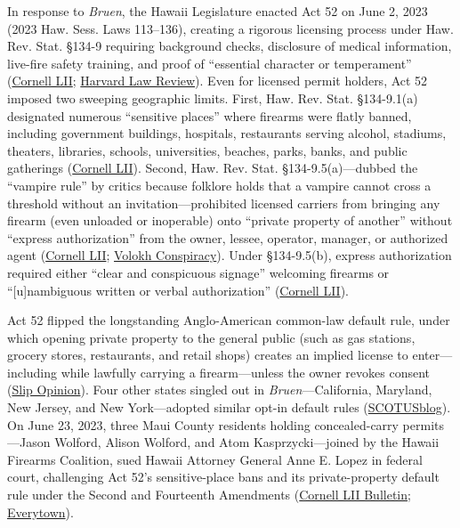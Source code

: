 \documentclass[12pt]{article}
\begin{document}
In response to \textit{Bruen}, the Hawaii Legislature enacted Act 52 on June 2, 2023 (2023 Haw. Sess. Laws 113--136), creating a rigorous licensing process under Haw. Rev. Stat. \S{}134-9 requiring background checks, disclosure of medical information, live-fire safety training, and proof of ``essential character or temperament'' (\href{https://www.law.cornell.edu/supremecourt/text/24-1046}{Cornell LII}; \href{https://harvardlawreview.org/print/vol-140/wolford-v-lopez/}{Harvard Law Review}). Even for licensed permit holders, Act 52 imposed two sweeping geographic limits. First, Haw. Rev. Stat. \S{}134-9.1(a) designated numerous ``sensitive places'' where firearms were flatly banned, including government buildings, hospitals, restaurants serving alcohol, stadiums, theaters, libraries, schools, universities, beaches, parks, banks, and public gatherings (\href{https://www.law.cornell.edu/supremecourt/text/24-1046}{Cornell LII}). Second, Haw. Rev. Stat. \S{}134-9.5(a)---dubbed the ``vampire rule'' by critics because folklore holds that a vampire cannot cross a threshold without an invitation---prohibited licensed carriers from bringing any firearm (even unloaded or inoperable) onto ``private property of another'' without ``express authorization'' from the owner, lessee, operator, manager, or authorized agent (\href{https://www.law.cornell.edu/supremecourt/text/24-1046}{Cornell LII}; \href{https://reason.com/volokh/2026/10/28/how-wolford-v-lopez-refines-second-amendment-doctrine/}{Volokh Conspiracy}). Under \S{}134-9.5(b), express authorization required either ``clear and conspicuous signage'' welcoming firearms or ``[u]nambiguous written or verbal authorization'' (\href{https://www.law.cornell.edu/supremecourt/text/24-1046}{Cornell LII}).

Act 52 flipped the longstanding Anglo-American common-law default rule, under which opening private property to the general public (such as gas stations, grocery stores, restaurants, and retail shops) creates an implied license to enter---including while lawfully carrying a firearm---unless the owner revokes consent (\href{https://www.supremecourt.gov/opinions/25pdf/24-1046_nmio.pdf}{Slip Opinion}). Four other states singled out in \textit{Bruen}---California, Maryland, New Jersey, and New York---adopted similar opt-in default rules (\href{https://www.scotusblog.com/2026/06/supreme-court-strikes-hawaii-gun-restriction/}{SCOTUSblog}). On June 23, 2023, three Maui County residents holding concealed-carry permits---Jason Wolford, Alison Wolford, and Atom Kasprzycki---joined by the Hawaii Firearms Coalition, sued Hawaii Attorney General Anne E. Lopez in federal court, challenging Act 52's sensitive-place bans and its private-property default rule under the Second and Fourteenth Amendments (\href{https://www.law.cornell.edu/supct/cert/24-1046}{Cornell LII Bulletin}; \href{https://www.everytown.org/wolford-v-lopez-second-amendment-scotus-oral-argument/}{Everytown}).
\end{document}
